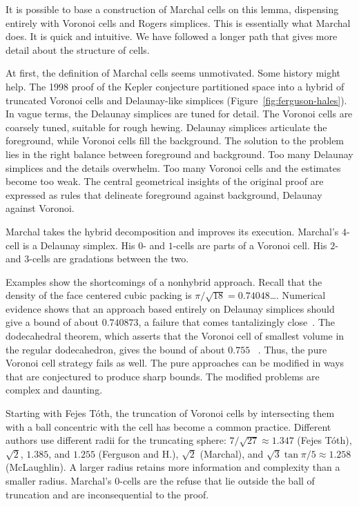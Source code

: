 It is possible to base a construction of Marchal cells on this lemma,
dispensing entirely with Voronoi cells and Rogers simplices.  This is
essentially what Marchal does.  It is quick and intuitive.  We have
followed a longer path that gives more detail about the structure of
cells.

\bigskip

At first, the definition of Marchal cells seems unmotivated.  Some
history might help.  The 1998 proof of the Kepler conjecture
partitioned space into a hybrid of truncated Voronoi cells and Delaunay-like
simplices (Figure~\ref{fig:ferguson-hales}).  
In vague terms, the Delaunay simplices are tuned for
detail.  The Voronoi cells are coarsely tuned, suitable for rough
hewing.  Delaunay simplices articulate the foreground, while Voronoi
cells fill the background.  The solution to the problem lies in the
right balance between foreground and background.  Too many Delaunay
simplices and the details overwhelm.  Too many Voronoi cells and the
estimates become too weak.  The central geometrical insights of the
original proof are expressed as rules that delineate foreground
against background, Delaunay against Voronoi.

\figFIFJALK %

Marchal takes the  hybrid decomposition and improves its
execution.  Marchal's $4$-cell is a Delaunay simplex.  His $0$- and
$1$-cells are parts of a Voronoi cell.  His $2$- and $3$-cells are
gradations between the two.

Examples show the shortcomings of a nonhybrid approach.  Recall that
the density of the face centered cubic packing is
$\pi/\sqrt{18}=0.74048$\ldots.  Numerical evidence shows that an
approach based entirely on Delaunay simplices should give a bound of
about $0.740873$, a failure that comes tantalizingly
close~\cite{Hales:1992:JCAM}.  The dodecahedral theorem, which asserts
that the Voronoi cell of smallest volume in the regular dodecahedron,
gives the bound of about $0.755$ ~\cite{Hales:2010:Dodec}.  Thus, the
pure Voronoi cell strategy fails as well.  The pure approaches can be
modified in ways that are conjectured to produce sharp bounds. The
modified problems are complex and daunting.

Starting with Fejes T\'oth, the truncation of Voronoi cells by
intersecting them with a ball concentric with the cell has become a
common practice.  Different authors use different radii for the
truncating sphere: $7/\sqrt{27}\approx 1.347$ (Fejes T\'oth),
$\sqrt2$, $1.385$, and $1.255$ (Ferguson and H.), $\sqrt2$ (Marchal),
and $\sqrt{3}\tan{\pi/5}\approx 1.258$ (McLaughlin).  A larger radius
retains more information and complexity than a smaller radius.
Marchal's $0$-cells are the refuse that lie outside the ball of
truncation and are inconsequential to the proof.


